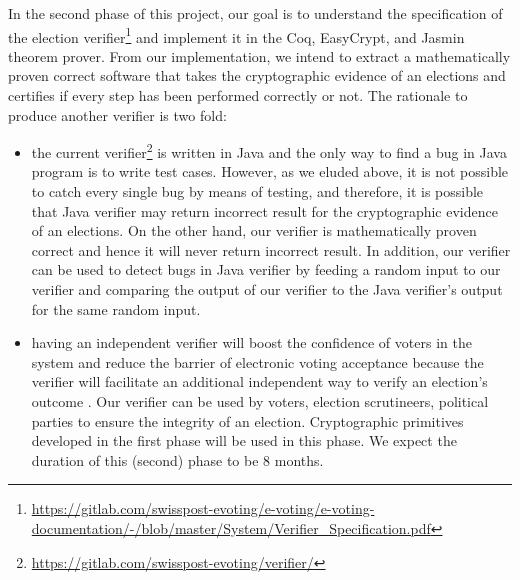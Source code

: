 \documentclass[a4paper]{article}
\begin{document}
In the second phase of this project, our goal is to understand the specification of the election 
verifier\footnote{\url{https://gitlab.com/swisspost-evoting/e-voting/e-voting-documentation/-/blob/master/System/Verifier_Specification.pdf}}
and implement it in the Coq, EasyCrypt, and Jasmin theorem prover. From our implementation, 
we intend to extract a mathematically proven correct software that takes the cryptographic 
evidence of an elections and certifies if every step has been performed correctly or not. The rationale 
to produce another verifier is two fold: 
\begin{itemize}
  \item the current verifier\footnote{\url{https://gitlab.com/swisspost-evoting/verifier/}} 
is written in Java and the only way to 
find a bug in Java program is to write test cases. However, as we eluded above, it is not 
possible to catch every single bug by means of testing, and therefore, it is possible that 
Java verifier may return incorrect result for the cryptographic evidence of an elections. On the 
other hand, our verifier is mathematically proven correct and hence it will never return incorrect result.
In addition, our verifier can be used to detect bugs in Java verifier by feeding a random input 
to our verifier and comparing the output of our verifier to the Java verifier's output for the 
same random input. 

\item having an independent verifier will boost the confidence of voters in the system and 
reduce the barrier of electronic voting acceptance because the verifier will facilitate 
an additional independent way to verify an election's outcome \cite{rivest2008notion}. 
Our verifier can be used by voters, election scrutineers, political parties to ensure the 
integrity of an election. 
Cryptographic primitives developed in the first phase will be used in this phase. 
We expect the duration of this (second) phase to be 8 months.

\end{itemize}
\end{document}
